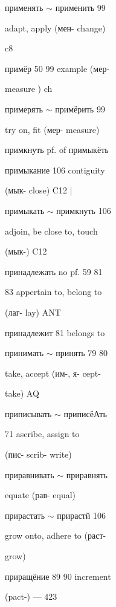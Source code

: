 \clearpage
\thispagestyle{plain}
\begingroup
\cyrillicfont
\fontsize{7.25}{8.25}\selectfont
\setlength{\parindent}{0pt}
\setlength{\parskip}{0pt}
\setlength{\emergencystretch}{1.5em}
\noindent
\begin{minipage}[t]{0.475\textwidth}
\raggedright
\noindent применять $\sim$ применить 99\par
\noindent adapt, apply (мен- change)\par
\noindent c8\par
\noindent примёр 50 99 example (мер-\par
\noindent measure ) ch\par
\noindent примерять $\sim$ примёрить 99\par
\noindent try on, fit (мер- measure)\par
\noindent примкнуть pf. of примыкёть\par
\noindent примыкание 106 contiguity\par
\noindent (мык- close) C12 |\par
\noindent примыкать $\sim$ примкнуть 106\par
\noindent adjoin, be close to, touch\par
\noindent (мык-) C12\par
\noindent принадлежать no pf. 59 81\par
{} 83 appertain to, belong to\par
\noindent (лаг- lay) ANT\par
\noindent принадлежит 81 belongs to\par
\noindent принимать $\sim$ принять 79 80\par
\noindent take, accept (им-, я- cept-\par
\noindent take) AQ\par
\noindent приписывать $\sim$ приписёАть\par
{} 71 ascribe, assign to\par
\noindent (пис- scrib- write)\par
\noindent приравнивать $\sim$ приравнять\par
{} equate (рав- equal)\par
\noindent прирастать $\sim$ прирастй 106\par
\noindent grow onto, adhere to (раст-\par
\noindent grow)\par
\noindent приращёние 89 90 increment\par
\noindent (pact-) — 423\par

\end{minipage}
